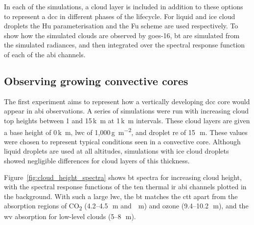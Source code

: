 In each of the simulations, a cloud layer is included in addition to these options to represent a \acrshort{dcc} in different phases of the lifecycle.
For liquid and ice cloud droplets the Hu parameterisation \citep{hu_accurate_1993} and the Fu scheme \citep{fu_accurate_1996, fu_accurate_1998} are used respectively. 
To show how the simulated clouds are observed by \acrshort{goes}-16, \acrshort{bt} are simulated from the simulated radiances, and then integrated over the spectral response function of each of the \acrshort{abi} channels.

\subsection{Observing growing convective cores}\label{sec:theory_core}

The first experiment aims to represent how a vertically developing \acrshort{dcc} core would appear in \acrshort{abi} observations.
A series of simulations were run with increasing cloud top heights between 1 and 15\,\unit{k m} at 1\,\unit{k m} intervals.
These cloud layers are given a base height of 0\,\unit{k m}, \acrfull{lwc} of 1,000\,\unit{g m^{-2}}, and droplet \acrfull{re} of 15\,\unit{\mu m}.
These values were chosen to represent typical conditions seen in a convective core.
Although liquid droplets are used at all altitudes, simulations with ice cloud droplets showed negligible differences for cloud layers of this thickness.

Figure~\ref{fig:cloud_height_spectra} shows \acrshort{bt} spectra for increasing cloud height, with the spectral response functions of the ten thermal \acrshort{ir} \acrshort{abi} channels plotted in the background.
With such a large \acrshort{lwc}, the \acrshort{bt} matches the \acrshort{ctt} apart from the absorption regions of CO\textsubscript{2} (4.2--4.5\,\unit{\mu m} and \,\unit{\mu m}) and ozone (9.4--10.2\,\unit{\mu m}), and the \acrshort{wv} absorption for low-level clouds (5--8\,\unit{\mu m}).


